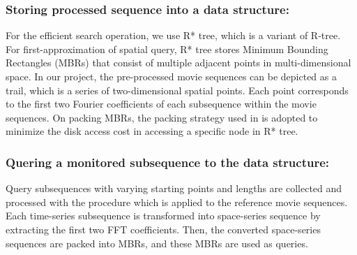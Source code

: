 \subsubsection{Storing processed sequence into a data structure:} 
For the efficient search operation, we use R* tree\cite{Beckmann:1990}, which is a variant of R-tree. For first-approximation of spatial query, R* tree stores Minimum Bounding Rectangles (MBRs) that consist of multiple adjacent points in multi-dimensional space. In our project, the pre-processed movie sequences can be depicted as a trail, which is a series of two-dimensional spatial points. Each point corresponds to the first two Fourier coefficients of each subsequence within the movie sequences. On packing MBRs, the packing strategy used in \cite{Faloutsos:1994}\cite{Kamel:1993} is adopted to minimize the disk access cost in accessing a specific node in R* tree.

\subsubsection{Quering a monitored subsequence to the data structure:} Query subsequences with varying starting points and lengths are collected and processed with the procedure which is applied to the reference movie sequences. Each time-series subsequence is transformed into space-series sequence by extracting the first two FFT coefficients. Then, the converted space-series sequences are packed into MBRs, and these MBRs are used as queries.
